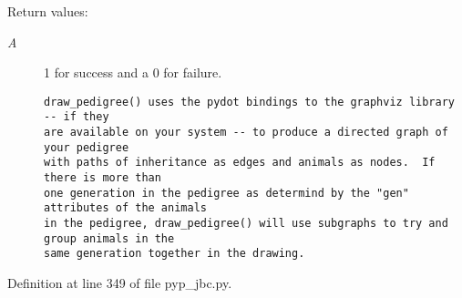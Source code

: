\begin{Desc}
\item[Return values:]
\begin{description}
\item[{\em A}]1 for success and a 0 for failure.

\footnotesize\begin{verbatim}draw_pedigree() uses the pydot bindings to the graphviz library -- if they
are available on your system -- to produce a directed graph of your pedigree
with paths of inheritance as edges and animals as nodes.  If there is more than
one generation in the pedigree as determind by the "gen" attributes of the animals
in the pedigree, draw_pedigree() will use subgraphs to try and group animals in the
same generation together in the drawing.
\end{verbatim}
\normalsize
 \end{description}
\end{Desc}


Definition at line 349 of file pyp\_\-jbc.py.